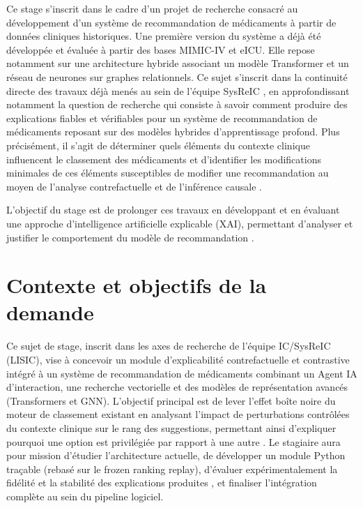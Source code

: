 \documentclass{article}
\begin{document}
Ce stage s’inscrit dans le cadre d’un projet de recherche consacré au développement d’un système de recommandation de médicaments à partir de données cliniques historiques. Une première version du système a déjà été développée et évaluée à partir des bases MIMIC-IV et eICU. Elle repose notamment sur une architecture hybride associant un modèle Transformer et un réseau de neurones sur graphes relationnels. Ce sujet s'inscrit dans la continuité directe des travaux déjà menés au sein de l'équipe SysReIC \cite{Garouani_2022, Ahmad2023, choaib:hal-05068872}, en approfondissant notamment la question de recherche qui consiste à savoir comment produire des explications fiables et vérifiables pour un système de recommandation de médicaments reposant sur des modèles hybrides d’apprentissage profond. Plus précisément, il s’agit de déterminer quels éléments du contexte clinique influencent le classement des médicaments et d’identifier les modifications minimales de ces éléments susceptibles de modifier une recommandation au moyen de l'analyse contrefactuelle \cite{guidotti2024counterfactual, prado2024survey, nguyen2026top} et de l'inférence causale \cite{luo2024survey}.


L’objectif du stage est de prolonger ces travaux en développant et en évaluant une approche d’intelligence artificielle explicable (XAI), permettant d’analyser et justifier le comportement du modèle de recommandation \cite{Garouani_2022, choaib:hal-05068872}.


\section{Contexte et objectifs de la demande}


Ce sujet de stage, inscrit dans les axes de recherche de l’équipe IC/SysReIC (LISIC), vise à concevoir un module d'explicabilité contrefactuelle et contrastive \cite{guidotti2024counterfactual, prado2024survey} intégré à un système de recommandation de médicaments combinant un Agent IA d'interaction, une recherche vectorielle et des modèles de représentation avancés (Transformers et GNN). L’objectif principal est de lever l'effet \og boîte noire \fg{}  du moteur de classement existant en analysant l'impact de perturbations contrôlées du contexte clinique sur le rang des suggestions, permettant ainsi d'expliquer pourquoi une option est privilégiée par rapport à une autre \cite{luo2024survey, nguyen2026top}. Le stagiaire aura pour mission d'étudier l'architecture actuelle, de développer un module Python traçable (rebasé sur le frozen ranking replay), d'évaluer expérimentalement la fidélité et la stabilité des explications produites \cite{nguyen2026top}, et finaliser l'intégration complète au sein du pipeline logiciel.
\end{document}
